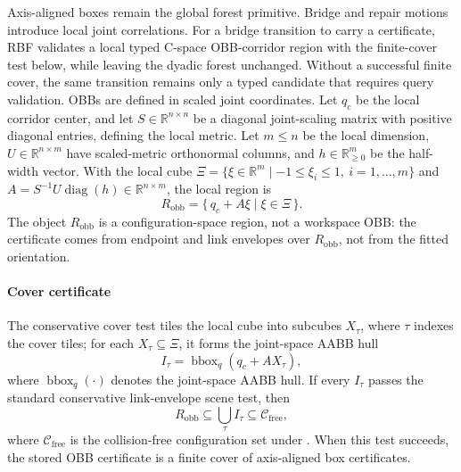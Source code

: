 \documentclass[journal]{IEEEtran}
\DeclareRobustCommand{\textsc}[1]{\textnormal{\MakeUppercase{#1}}}
\newcommand{\rbf}{\textsc{RBF}}
\newcommand{\Real}{\ensuremath{\mathbb{R}}}
\newcommand{\Cfree}{\ensuremath{\mathcal{C}_{\mathrm{free}}}}
\newcommand{\cspace}{\mbox{C-space}}
\begin{document}
Axis-aligned boxes remain the global forest primitive. Bridge and repair motions
introduce local joint correlations. For a bridge transition to carry a
certificate, \rbf{} validates a local typed \cspace{} \mbox{OBB-corridor}
region with the finite-cover test below, while leaving the dyadic forest
unchanged. Without a successful finite cover, the same transition remains only a
typed candidate that requires query validation. OBBs are defined
in scaled joint coordinates. Let \(q_c\) be the local corridor center, and let
\(S\in\Real^{n\times n}\) be a diagonal joint-scaling matrix with positive
diagonal entries, defining the local metric. Let \(m\le n\) be the local dimension,
\(U\in\Real^{n\times m}\) have scaled-metric orthonormal columns, and
\(h\in\Real_{\ge 0}^{m}\) be the half-width vector. With the local cube
\(\Xi=\{\xi\in\Real^m\mid -1\le \xi_i\le 1,\ i=1,\ldots,m\}\) and
\(A=S^{-1}U\operatorname{diag}(h)\in\Real^{n\times m}\),
the local region is
\[
R_{\mathrm{obb}}
=
\{\,q_c + A\xi \mid \xi\in\Xi\,\}.
\]
The object \(R_{\mathrm{obb}}\) is a configuration-space region, not a workspace OBB:
the certificate comes from endpoint and link envelopes over \(R_{\mathrm{obb}}\), not
from the fitted orientation.

\paragraph{Cover certificate}
The conservative cover test tiles the local cube into subcubes \(X_\tau\), where
\(\tau\) indexes the cover tiles; for each \(X_\tau\subseteq\Xi\), it forms the
joint-space AABB hull
\[
I_\tau=\operatorname{bbox}_q(q_c+A X_\tau),
\]
where \(\operatorname{bbox}_q(\cdot)\) denotes the joint-space AABB hull. If
every \(I_\tau\) passes the standard conservative link-envelope scene test, then
\[
R_{\mathrm{obb}}\subseteq \bigcup_\tau I_\tau \subseteq \Cfree,
\]
where \(\Cfree\) is the collision-free configuration set under
. When this test succeeds, the stored OBB certificate
is a finite cover of axis-aligned box certificates.
\end{document}

